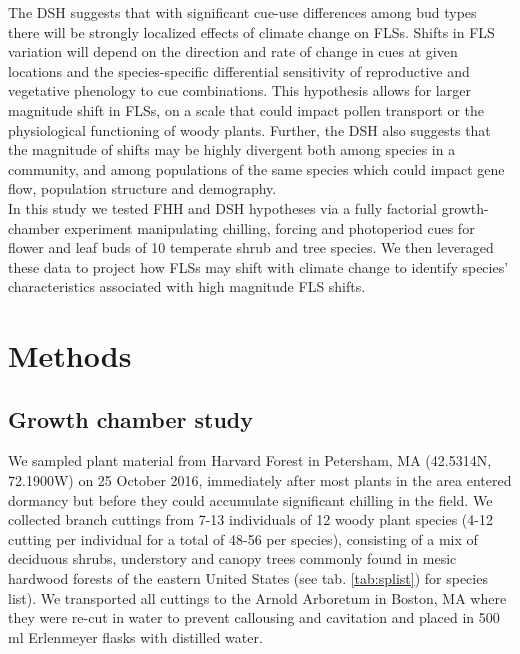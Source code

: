 \documentclass[11pt]{article}\usepackage[]{graphicx}\usepackage[]{color}
\begin{document}
\noindent The DSH suggests that with significant cue-use differences among bud types there will be strongly localized effects of climate change on FLSs. Shifts in FLS variation will depend on the direction and rate of change in cues at given locations and the species-specific differential sensitivity of reproductive and vegetative phenology to cue combinations. This hypothesis allows for larger magnitude shift in FLSs, on a scale that could impact pollen transport or the physiological functioning of woody plants. Further, the DSH also suggests that the magnitude of shifts may be highly divergent both among species in a community, and among populations of the same species which could impact gene flow, population structure and demography.\\

\noindent In this study we tested FHH and DSH hypotheses via a fully factorial growth-chamber experiment manipulating chilling, forcing and photoperiod cues for flower and leaf buds of 10 temperate shrub and tree species. We then leveraged these data to project how FLSs may shift with climate change to identify species' characteristics associated with high magnitude FLS shifts.\\

\section*{Methods}

\subsection*{Growth chamber study}

\noindent We sampled plant material from Harvard Forest in Petersham, MA (42.5314\degree N, 72.1900\degree W) on 25 October 2016, immediately after most plants in the area entered dormancy but before they could accumulate significant chilling in the field. We collected branch cuttings from 7-13 individuals of 12 woody plant species (4-12 cutting per individual for a total of 48-56 per species), consisting of a mix of deciduous shrubs, understory and canopy trees commonly found in mesic hardwood forests of the eastern United States (see tab. \ref{tab:splist}) for species list). We transported all cuttings to the Arnold Arboretum in Boston, MA where they were re-cut in water to prevent callousing and cavitation and placed in 500 ml Erlenmeyer flasks with distilled water.\\ 
\end{document}
